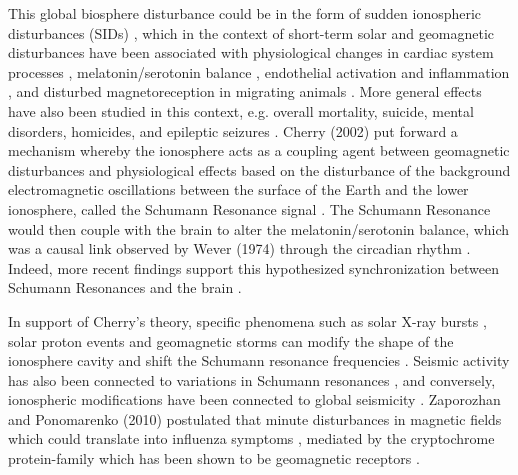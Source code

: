 \documentclass{article}
\begin{document}
This global biosphere disturbance could be in the form of sudden ionospheric disturbances (SIDs) \cite{cannon1982schumann}, which in the context of short-term solar and geomagnetic disturbances have been associated with physiological changes in cardiac system processes \cite{vieira2022geomagnetic,Alabdulgader2018,ghione1998geomagnetic,chernouss2001geophysical,stoupel1995ambulatory,stoupel2011twenty,malin1979correlation,stoupel1993sudden}, melatonin/serotonin balance \cite{burch1999geomagnetic,rapoport1997effects,bergiannaki1996seasonal}, endothelial activation and inflammation \cite{schiff2022role}, and disturbed magnetoreception in migrating animals \cite{keeton1974normal,schreiber1976correlation,kowalski1988normal,bianco2019magnetic,ferrari2017cetacean,vanselow2018solar,granger2020gray}. More general effects have also been studied in this context, e.g. overall mortality, suicide, mental disorders, homicides, and epileptic seizures \cite{zenchenko2021possible,zilli2019geomagnetic,gordon2003effect,kay1994geomagnetic,kay2004schizophrenia,halberg2005chronomics,berk2006ambient,doronin1998effect,persinger1995sudden}. Cherry (2002) put forward a mechanism whereby the ionosphere acts as a coupling agent between geomagnetic disturbances and physiological effects based on the disturbance of the background electromagnetic oscillations between the surface of the Earth and the lower ionosphere, called the Schumann Resonance signal \cite{cherry2002schumann,schumann1952strahlungslosen}. The Schumann Resonance would then couple with the brain to alter the melatonin/serotonin balance, which was a causal link observed by Wever (1974) through the circadian rhythm \cite{wever1974elf}. Indeed, more recent findings support this hypothesized synchronization between Schumann Resonances and the brain \cite{pobachenko2006contingency,saroka2014quantitative,persinger2015human,konig2012biologic}.

In support of Cherry's theory, specific phenomena such as solar X-ray bursts \cite{dyrda2015novel,roldugin2004schumann,satori2005response,satori2016effects,shvets2017effect}, solar proton events \cite{roldugin2004schumann,schlegel1999schumann,singh2014x} and geomagnetic storms \cite{pazos2019analysis,salinas2016solar} can modify the shape of the ionosphere cavity and shift the Schumann resonance frequencies \cite{kudintseva2018modifications,satori2016effects,zhou2015studies}. Seismic activity has also been connected to variations in Schumann resonances \cite{christofilakis2019significant,galuk2019scattering,hayakawa2020scattering}, and conversely, ionospheric modifications have been connected to global seismicity \cite{Marchitelli2020}. Zaporozhan and Ponomarenko (2010) postulated that minute disturbances in magnetic fields which could translate into influenza symptoms \cite{zaporozhan2010mechanisms}, mediated by the cryptochrome protein-family which has been shown to be geomagnetic receptors \cite{rodgers2009chemical,engels2014anthropogenic,hiscock2016quantum}.
\end{document}

